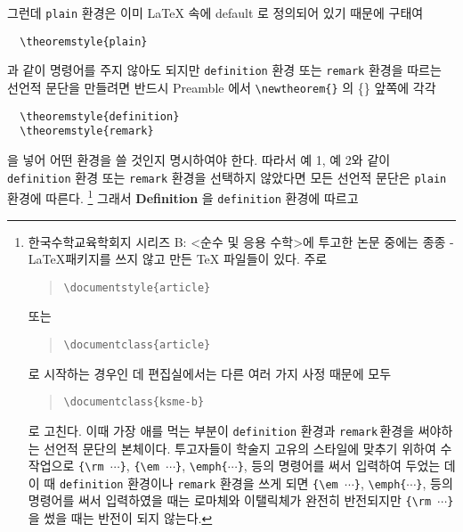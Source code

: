 \documentclass[a4paper,10pt]{amsproc}
\newcommand\env[1]{\texttt{#1}}
\begin{document}
그런데 \env{plain} 환경은 이미 \LaTeX{} 속에 default 로 정의되어 있기
때문에 구태여
\begin{verbatim}
  \theoremstyle{plain}
\end{verbatim}
과 같이 명령어를 주지 않아도 되지만 \env{definition} 환경 또는
\env{remark} 환경을 따르는 선언적 문단을 만들려면 반드시 Preamble
에서 \texttt{\textbackslash newtheorem\{\;\}} 의 \{\;\} 앞쪽에 각각
\begin{verbatim}
  \theoremstyle{definition}
  \theoremstyle{remark}
\end{verbatim}
을 넣어 어떤 환경을 쓸 것인지 명시하여야 한다. 따라서 예 1, 예 2와 같이
\env{definition} 환경 또는 \env{remark} 환경을 선택하지 않았다면
모든 선언적 문단은 \env{plain} 환경에 따른다.%
\footnote{\label{a4}%
  한국수학교육학회지 시리즈 B: <순수 및 응용 수학>에 투고한 논문
  중에는 종종 \AmS-\LaTeX 패키지를 쓰지 않고 만든 \TeX{} 파일들이 있다.
  주로
  \begin{quote}
  \texttt{\textbackslash documentstyle\{article\}}
  \end{quote}
  또는
  \begin{quote}
     \texttt{\textbackslash documentclass\{article\}}
  \end{quote}
  로 시작하는 경우인 데 편집실에서는 다른 여러 가지 사정 때문에 모두
  \begin{quote}
     \texttt{\textbackslash documentclass\{ksme-b\}}
  \end{quote}
  로 고친다. 이때 가장 애를 먹는 부분이 \env{definition} 환경과
  \env{remark}\,환경을 써야하는 선언적 문단의 본체이다. 투고자들이
  학술지 고유의 스타일에 맞추기 위하여 수작업으로 
  \texttt{\{\textbackslash rm $\cdots$\}}, \texttt{\{\textbackslash em
  $\cdots$\}}, {\tt \textbackslash emph\{$\cdots$\}}, 
  등의 명령어를 써서
  입력하여 두었는 데 이 때 \env{definition} 환경이나
  \env{remark} 환경을 쓰게 되면 
  \texttt{\{\textbackslash em
  $\cdots$\}}, {\tt \textbackslash emph\{$\cdots$\}}, 
  등의 명령어를 써서
  입력하였을 때는 로마체와 이탤릭체가 완전히 반전되지만
  \texttt{\{\textbackslash rm $\cdots$\}} 
  을 썼을 때는 반전이 되지 않는다.}
그래서 \textbf{Definition} 을 \env{definition} 환경에 따르고
\end{document}
